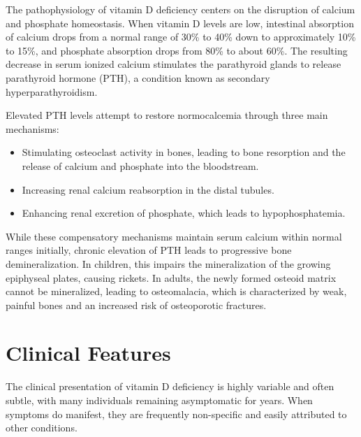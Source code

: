 The pathophysiology of vitamin D deficiency centers on the disruption of calcium and phosphate homeostasis. When vitamin D levels are low, intestinal absorption of calcium drops from a normal range of 30\% to 40\% down to approximately 10\% to 15\%, and phosphate absorption drops from 80\% to about 60\%. The resulting decrease in serum ionized calcium stimulates the parathyroid glands to release parathyroid hormone (PTH), a condition known as secondary hyperparathyroidism.

Elevated PTH levels attempt to restore normocalcemia through three main mechanisms:
\begin{itemize}
    \item Stimulating osteoclast activity in bones, leading to bone resorption and the release of calcium and phosphate into the bloodstream.
    \item Increasing renal calcium reabsorption in the distal tubules.
    \item Enhancing renal excretion of phosphate, which leads to hypophosphatemia.
\end{itemize}

While these compensatory mechanisms maintain serum calcium within normal ranges initially, chronic elevation of PTH leads to progressive bone demineralization. In children, this impairs the mineralization of the growing epiphyseal plates, causing rickets. In adults, the newly formed osteoid matrix cannot be mineralized, leading to osteomalacia, which is characterized by weak, painful bones and an increased risk of osteoporotic fractures.

\section*{Clinical Features}
The clinical presentation of vitamin D deficiency is highly variable and often subtle, with many individuals remaining asymptomatic for years. When symptoms do manifest, they are frequently non-specific and easily attributed to other conditions.

